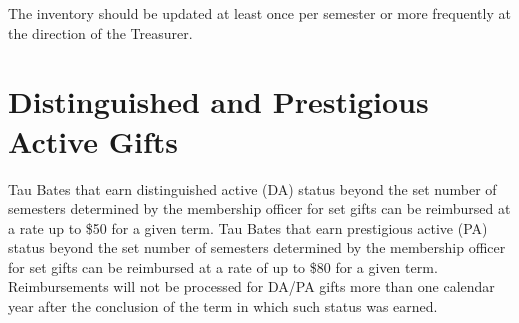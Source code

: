 \documentclass[bylaws,final,10pt,withoutoptional,withoutpreface,officerdoc]{../bylaws}
\begin{document}
The inventory should be updated at least once per semester or more frequently at the direction of the Treasurer.


\section{Distinguished and Prestigious Active Gifts} Tau Bates that earn distinguished active (DA) status beyond the set number of semesters determined by the membership officer for set gifts can be reimbursed at a rate up to \$50 for a given term. Tau Bates that earn prestigious active (PA) status beyond the set number of semesters determined by the membership officer for set gifts can be reimbursed at a rate of up to \$80 for a given term. Reimbursements will not be processed for DA/PA gifts more than one calendar year after the conclusion of the term in which such status was earned. 



\end{document}

